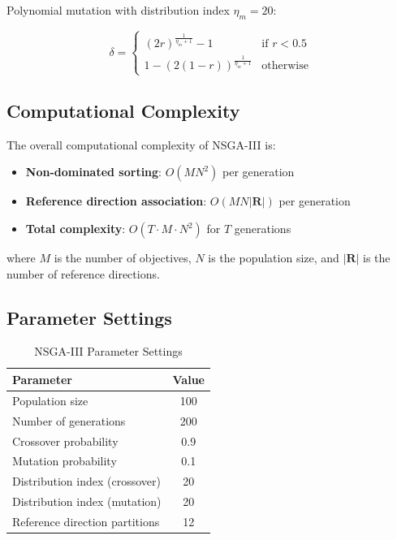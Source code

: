 Polynomial mutation with distribution index $\eta_m = 20$:

\begin{equation}
\delta = \begin{cases}
(2r)^{\frac{1}{\eta_m + 1}} - 1 & \text{if } r < 0.5 \\
1 - (2(1-r))^{\frac{1}{\eta_m + 1}} & \text{otherwise}
\end{cases}
\end{equation}

\subsection{Computational Complexity}

The overall computational complexity of NSGA-III is:

\begin{itemize}
    \item \textbf{Non-dominated sorting}: $O(MN^2)$ per generation
    \item \textbf{Reference direction association}: $O(MN|\mathbf{R}|)$ per generation
    \item \textbf{Total complexity}: $O(T \cdot M \cdot N^2)$ for $T$ generations
\end{itemize}

where $M$ is the number of objectives, $N$ is the population size, and $|\mathbf{R}|$ is the number of reference directions.

\subsection{Parameter Settings}

\begin{table}[H]
\centering
\caption{NSGA-III Parameter Settings}
\label{tab:nsga3_params}
\begin{tabular}{lc}
\toprule
Parameter & Value \\
\midrule
Population size & 100 \\
Number of generations & 200 \\
Crossover probability & 0.9 \\
Mutation probability & 0.1 \\
Distribution index (crossover) & 20 \\
Distribution index (mutation) & 20 \\
Reference direction partitions & 12 \\
\bottomrule
\end{tabular}
\end{table}


